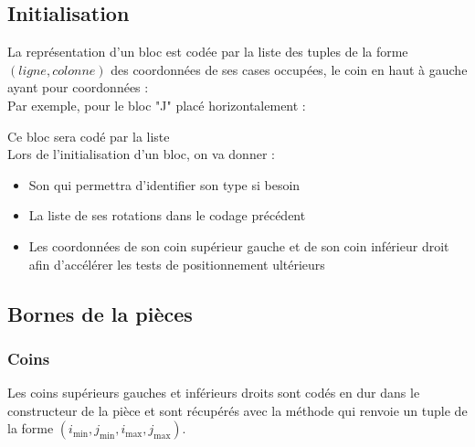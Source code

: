 \subsection{Initialisation}
La représentation d'un bloc est codée par la liste des tuples de la forme $(ligne,colonne)$ des coordonnées de ses cases occupées, le coin en haut à gauche ayant pour coordonnées  :\\
Par exemple, pour le bloc "J" placé horizontalement :

Ce bloc sera codé par la liste \pyth{[(0,0), (1,0), (1,1), (1,2)]}\\

Lors de l'initialisation d'un bloc, on va donner :
\begin{itemize}
	\item Son  qui permettra d'identifier son type si besoin
	\item La liste de ses rotations dans le codage précédent
	\item Les coordonnées de son coin supérieur gauche et de son coin inférieur droit afin d'accélérer les tests de positionnement ultérieurs
\end{itemize}


\subsection{Bornes de la pièces}
\subsubsection{Coins}
Les coins supérieurs gauches et inférieurs droits sont codés en dur dans le constructeur de la pièce et sont récupérés avec la méthode  qui renvoie un tuple de la forme $(i_\text{min}, j_\text{min}, i_\text{max}, j_\text{max})$. 

